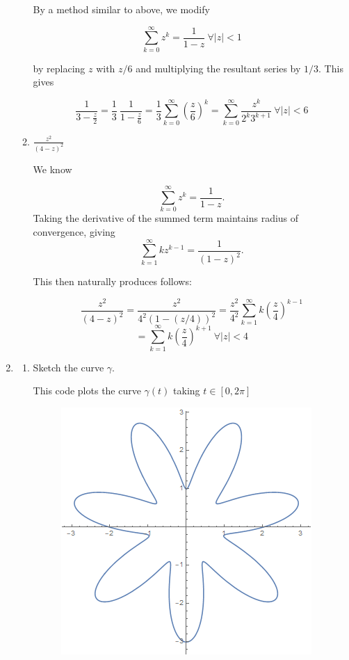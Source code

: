 \documentclass{article}
\begin{document}
\begin{enumerate}
\begin{enumerate}
		By a method similar to above, we modify 
		
		\[\sum_{k=0}^{\infty}z^k = \frac{1}{1-z}\ \forall|z|<1 \]
		
		by replacing $z$ with $z/6$ and multiplying the resultant series by $1/3$. This gives
		
		\[\frac{1}{3-\frac{z}{2}}=\frac{1}{3}\ \frac{1}{1-\frac{z}{6}}=\frac{1}{3}\sum_{k=0}^{\infty}\left(\frac{z}{6} \right)^k=\sum_{k=0}^{\infty}\frac{z^k}{2^k 3^{k+1}}\ \forall |z|<6 \]
		
		\item $\frac{z^2}{(4-z)^2}$
		
		We know
		
		\[\sum_{k=0}^{\infty}z^k=\frac{1}{1-z}. \]
		Taking the derivative of the summed term maintains radius of convergence, giving
		\[\sum_{k=1}^{\infty}kz^{k-1}=\frac{1}{(1-z)^2}. \]
		
		This then naturally produces follows:
		
		\[\frac{z^2}{(4-z)^2}=\frac{z^2}{4^2(1-(z/4))^2} =\frac{z^2}{4^2}\sum_{k=1}^{\infty}k\left(\frac{z}{4}\right)^{k-1}\]
		\[=\sum_{k=1}^{\infty}k\left(\frac{z}{4}\right)^{k+1}\ \forall|z|<4 \]
	\end{enumerate}
	
	\item 
	\begin{enumerate}
		\item Sketch the curve $\gamma$.
		
		
		This code plots the curve $\gamma(t)$ taking $t\in [0,2\pi]$
		
		\begin{figure}[H]
		\includegraphics[scale=0.8]{image1.png}
		\end{figure}
		

\end{enumerate}
\end{enumerate}
\end{document}
